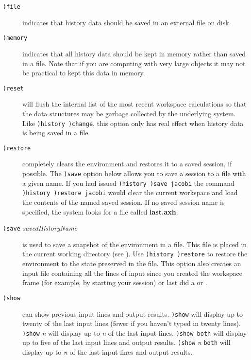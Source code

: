 {{{{{{{\begin{description}
\item[{\tt )file}]
indicates that history data should be saved in an external file on disk.

\item[{\tt )memory}]
indicates that all history data should be kept in memory rather than
saved in a file.
Note that if you are computing with very large objects it may not be
practical to kept this data in memory.

\item[{\tt )reset}]
will flush the internal list of the most recent workspace calculations
so that the data structures may be garbage collected by the underlying
\Lisp{} system.
Like {\tt )history )change}, this option only has real effect when
history data is being saved in a file.

\item[{\tt )restore} \ranb{}]
completely clears the environment and restores it to a saved session, if
possible.
The {\tt )save} option below allows you to save a session to a file
with a given name. If you had issued
{\tt )history )save jacobi}
the command
{\tt )history )restore jacobi}
would clear the current workspace and load the contents of the named
saved session. If no saved session name is specified, the system looks
for a file called {\bf last.axh}.

\item[{\tt )save} {\it savedHistoryName}]
is used to save  a snapshot of the environment in a file.
This file is placed in the current working directory
(see ).
Use {\tt )history )restore} to restore the environment to the state
preserved in the file.
This option also creates an input file containing all the lines of input
since you created the workspace frame (for example, by starting your
\Language{} session) or last did a  or
.

\item[{\tt )show} \ranb{} \ranb{}]
can show previous input lines and output results.
{\tt )show} will display up to twenty of the last input lines
(fewer if you haven't typed in twenty lines).
{\tt )show} {\it n} will display up to {\it n} of the last input lines.
{\tt )show both} will display up to five of the last input lines and
output results.
{\tt )show} {\it n} {\tt both} will display up to {\it n} of the last
input lines and output results.


\end{description}}}}}}}}
